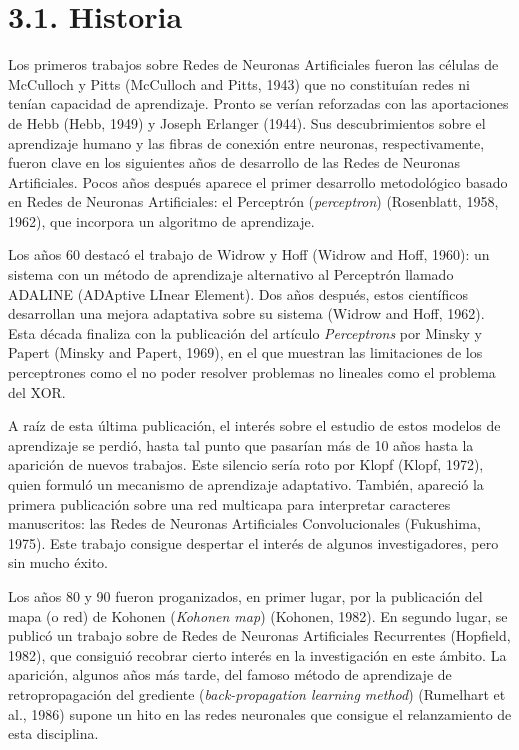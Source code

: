 \documentclass[spanish,a4paper,12pt,twoside]{report}
\begin{document}
    \section*{\Large 3.1. Historia}
    Los primeros trabajos sobre Redes de Neuronas Artificiales fueron las células de McCulloch y Pitts (McCulloch and Pitts, 1943) que no constituían redes ni tenían capacidad de aprendizaje. Pronto se verían reforzadas con las aportaciones de Hebb (Hebb, 1949) y Joseph Erlanger (1944). Sus descubrimientos sobre el aprendizaje humano y las fibras de conexión entre neuronas, respectivamente, fueron clave en los siguientes años de desarrollo de las Redes de Neuronas Artificiales. Pocos años después aparece el primer desarrollo metodológico basado en Redes de Neuronas Artificiales: el Perceptrón (\emph{perceptron}) (Rosenblatt, 1958, 1962), que incorpora un algoritmo de aprendizaje. \par
    Los años 60 destacó el trabajo de Widrow y Hoff (Widrow and Hoff, 1960): un sistema con un método de aprendizaje alternativo al Perceptrón llamado ADALINE (ADAptive LInear Element). Dos años después, estos científicos desarrollan una mejora adaptativa sobre su sistema (Widrow and Hoff, 1962). Esta década finaliza con la publicación del artículo \emph{Perceptrons} por Minsky y Papert (Minsky and Papert, 1969), en el que muestran las limitaciones de los perceptrones como el no poder resolver problemas no lineales como el problema del XOR. \par
    A raíz de esta última publicación, el interés sobre el estudio de estos modelos de aprendizaje se perdió, hasta tal punto que pasarían más de 10 años hasta la aparición de nuevos trabajos. Este silencio sería roto por Klopf (Klopf, 1972), quien formuló un mecanismo de aprendizaje adaptativo. También, apareció la primera publicación sobre una red multicapa para interpretar caracteres manuscritos: las Redes de Neuronas Artificiales Convolucionales (Fukushima, 1975). Este trabajo consigue despertar el interés de algunos investigadores, pero sin mucho éxito. \par
    Los años 80 y 90 fueron proganizados, en primer lugar, por la publicación del mapa (o red) de Kohonen (\emph{Kohonen map}) (Kohonen, 1982). En segundo lugar, se publicó un trabajo sobre de Redes de Neuronas Artificiales Recurrentes (Hopfield, 1982), que consiguió recobrar cierto interés en la investigación en este ámbito. La aparición, algunos años más tarde, del famoso método de aprendizaje de retropropagación del grediente (\emph{back-propagation learning method}) (Rumelhart et al., 1986) supone un hito en las redes neuronales que consigue el relanzamiento de esta disciplina.
    
\end{document}
